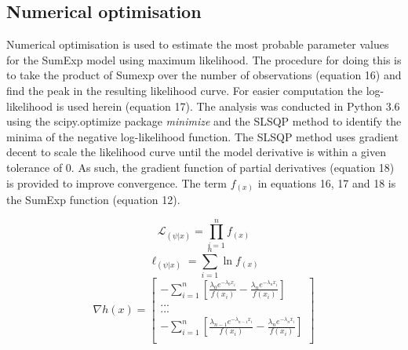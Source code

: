 \documentclass[11pt,usenames,dvipsnames,a4paper]{article}
\newcommand{\Lagr}{\mathcal{L}}
\begin{document}
\subsection{Numerical optimisation}

\begin{linenumbers}
\hspace{\parindent}
Numerical optimisation is used to estimate the most probable parameter values for the SumExp model using maximum likelihood. The procedure for doing this is to take the product of Sumexp over the number of observations (equation 16) and find the peak in the resulting likelihood curve. For easier computation the log-likelihood is used herein (equation 17). The analysis was conducted in Python 3.6 \citep{python} using the scipy.optimize package \textit{minimize} \citep{Jones2001} and the SLSQP method \citep{Kraft1988} to identify the minima of the negative log-likelihood function. The SLSQP method uses gradient decent to scale the likelihood curve until the model derivative is within a given tolerance of 0. As such, the gradient function of partial derivatives (equation 18) is provided to improve convergence. The term $f_{(x)}$ in equations 16, 17 and 18 is the SumExp function (equation 12).
\end{linenumbers}

\begin{equation}
\Lagr_{(\psi|x)} = \prod_{i=1}^{n} f_{(x)}
\end{equation} 
\begin{equation}
\ell_{(\psi|x)} = \sum_{i=1}^{n} \ln f_{(x)}
\end{equation} 
\begin{equation}
\nabla h(x) = \begin{bmatrix} -\sum_{i=1}^{n} [\frac{\lambda_0 e^{-\lambda_0 x_i}}{f(x_i)} - \frac{\lambda_n e^{-\lambda_n x_i}}{f(x_i)}] \\
... \\
... \\
-\sum_{i=1}^{n} [\frac{\lambda_{n-1} e^{-\lambda_{n-1} x_i}}{f(x_i)} - \frac{\lambda_n e^{-\lambda_n x_i}}{f(x_i)}] \\
\end{bmatrix}
\end{equation}
\end{document}
